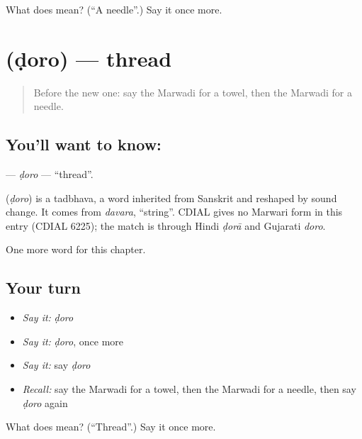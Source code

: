 \begin{tcolorbox}[breakable,colback=teal!4,colframe=teal!35!black,title={Before you move on}]
What does  mean? (\textquotedblleft{}A needle\textquotedblright{}.) Say it once more.
\end{tcolorbox}
\section[\texorpdfstring{\mw{डोरो} (ḍoro)}{डोरो (ḍoro)}]{ (ḍoro) — thread}

\label{lesson:MW-C124-doro}



\begin{quote}
Before the new one: say the Marwadi for a towel, then the Marwadi for a needle.
\end{quote}

\subsection*{You'll want to know: }
\textbf{} — \emph{ḍoro} — \textquotedblleft{}thread\textquotedblright{}.

\begin{cousinweb}
\textbf{} (\emph{ḍoro}) is a tadbhava, a word inherited from Sanskrit and reshaped by sound change. It comes from \emph{davara}, \textquotedblleft{}string\textquotedblright{}. CDIAL gives no Marwari form in this entry (CDIAL 6225); the match is through Hindi \emph{ḍorā} and Gujarati \emph{doro}.
\end{cousinweb}

\begin{grammarlens}[title={What you've built}]
One more word for this chapter.
\end{grammarlens}

\subsection*{Your turn}
\begin{itemize}
\raggedright
  \item \emph{Say it:} \emph{ḍoro}
  \item \emph{Say it:} \emph{ḍoro}, once more
  \item \emph{Say it:} say \emph{ḍoro}
  \item \emph{Recall:} say the Marwadi for a towel, then the Marwadi for a needle, then say \emph{ḍoro} again
\end{itemize}

\begin{tcolorbox}[breakable,colback=teal!4,colframe=teal!35!black,title={Before you move on}]
What does  mean? (\textquotedblleft{}Thread\textquotedblright{}.) Say it once more.
\end{tcolorbox}
